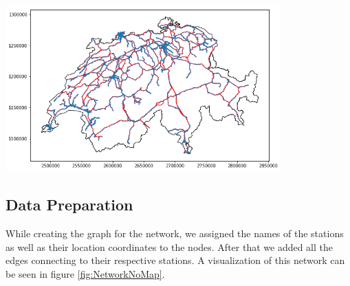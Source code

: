 \documentclass{Resources/netsci-project}
\begin{document}
\begin{center}
    \centering
    \includegraphics[width=300pt]{Resources/Network_on_map}
    \label{fig:NetworkOnMap}
\end{center}

\subsection{Data Preparation}
While creating the graph for the network, we assigned the names of the stations as well as their location coordinates to the nodes. After that we added all the edges connecting to their respective stations. A visualization of this network can be seen in figure \ref{fig:NetworkNoMap}.
\end{document}
